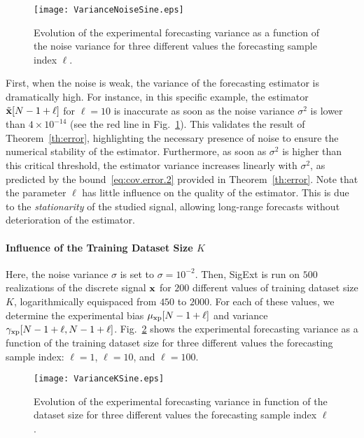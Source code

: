 \begin{figure}
\centering
\texttt{[image: VarianceNoiseSine.eps]}
\caption{Evolution of the experimental forecasting variance as a function of the noise variance for three different values the forecasting sample index $\ell$.}
\label{fig:res.noise.sine}
\end{figure}

First, when the noise is weak, the variance of the forecasting estimator is dramatically high. For instance, in this specific example, the estimator $\tilde{{\mathbf x}}[N-1+\ell]$ for $\ell=10$ is inaccurate as soon as the noise variance $\sigma^2$ is lower than $4\times 10^{-14}$ (see the red line in Fig.~\ref{fig:res.noise.sine}). This validates the result of Theorem~\ref{th:error}, highlighting the necessary presence of noise to ensure the numerical stability of the estimator. Furthermore, as soon as $\sigma^2$ is higher than this critical threshold, the estimator variance increases linearly with $\sigma^2$, as predicted by the bound~\eqref{eq:cov.error.2} provided in Theorem~\ref{th:error}. Note that the parameter $\ell$ has little influence on the quality of the estimator. This is due to the \textit{stationarity} of the studied signal, allowing long-range forecasts without deterioration of the estimator.

\paragraph{Influence of the Training Dataset Size $K$} Here, the noise variance $\sigma$ is set to $\sigma=10^{-2}$. Then, {\sf SigExt} is run on $500$ realizations of the discrete signal ${\mathbf x}$ for $200$ different values of training dataset size $K$, logarithmically equispaced from $450$ to $2000$. For each of these values, we determine the experimental bias $\mu_{{\mathrm{xp}}}[N-1+\ell]$ and variance $\gamma_{{\mathrm{xp}}}[N-1+\ell,N-1+\ell]$. Fig.~\ref{fig:res.size.sine} shows the experimental forecasting variance as a function of the training dataset size for three different values the forecasting sample index: $\ell=1$, $\ell=10$, and $\ell=100$.

\begin{figure}
\texttt{[image: VarianceKSine.eps]}
\caption{Evolution of the experimental forecasting variance in function of the dataset size for three different values the forecasting sample index $\ell$.}
\label{fig:res.size.sine}
\end{figure}

